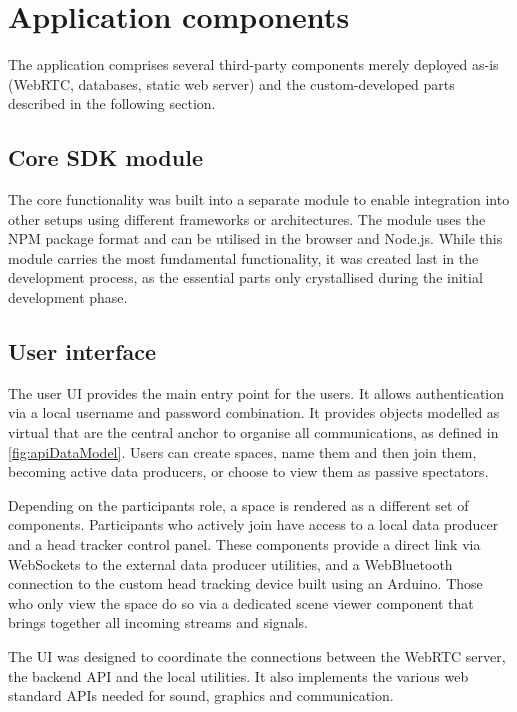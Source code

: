 \section{Application components}
\label{sec:application-components}

The application comprises several third-party components merely deployed as-is (WebRTC, databases, static web server) and the custom-developed parts described in the following section.

\subsection{Core SDK module}
\label{subsec:core-sdk-module}

The core functionality was built into a separate module to enable integration into other setups using different frameworks or architectures.
The module uses the \ac{NPM} package format and can be utilised in the browser and Node.js.
While this module carries the most fundamental functionality, it was created last in the development process, as the essential parts only crystallised during the initial development phase.

\subsection{User interface}
\label{subsec:user-interface}

The user \ac{UI} provides the main entry point for the users.
It allows authentication via a local username and password combination.
It provides objects modelled as virtual  that are the central anchor to organise all communications, as defined in \autoref{fig:apiDataModel}.
Users can create spaces, name them and then join them, becoming active data producers, or choose to view them as passive spectators.

Depending on the participant\textquotesingle s role, a space is rendered as a different set of components.
Participants who actively join have access to a local data producer and a head tracker control panel.
These components provide a direct link via WebSockets to the external data producer utilities, and a WebBluetooth connection to the custom head tracking device built using an Arduino.
Those who only view the space do so via a dedicated scene viewer component that brings together all incoming streams and signals.

The \ac{UI} was designed to coordinate the connections between the WebRTC server, the backend \ac{API} and the local utilities.
It also implements the various web standard \acp{API} needed for sound, graphics and communication.

